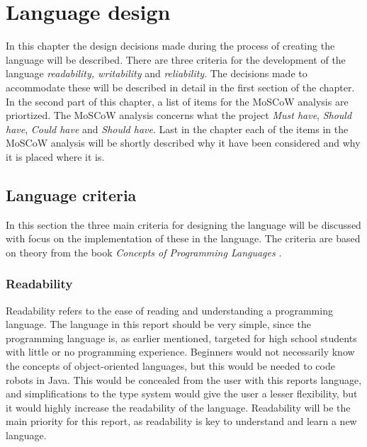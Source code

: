 \chapter{Language design}
\label{chap:LanguageDesign}
In this chapter the design decisions made during the process of creating the language will be described. There are three criteria for the development of the language \emph{readability, writability} and \emph{reliability}. The decisions made to accommodate these will be described in detail in the first section of the chapter. In the second part of this chapter, a list of items for the MoSCoW analysis are priortized. The MoSCoW analysis concerns what the project \textit{Must have}, \textit{Should have}, \textit{Could have} and \textit{Should have}. Last in the chapter each of the  items in the MoSCoW analysis will be shortly described why it have been considered and why it is placed where it is.
 
\section{Language criteria}

In this section the three main criteria for designing the language will be discussed with focus on the implementation of these in the language. The criteria are based on theory from the book \emph{Concepts of Programming Languages} \citep{Sebesta}.

\subsection{Readability}
Readability refers to the ease of reading and understanding a programming language. The language in this report should be very simple, since the programming language is, as earlier mentioned, targeted for high school students with little or no programming experience. Beginners would not necessarily know the concepts of object-oriented languages, but this would be needed to code robots in Java. This would be concealed from the user with this reports language, and simplifications to the type system would give the user a lesser flexibility, but it would highly increase the readability of the language. Readability will be the main priority for this report, as readability is key to understand and learn a new language.


